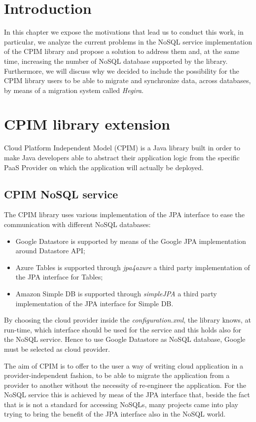 \section{Introduction}
In this chapter we expose the motivations that lead us to conduct this work, in particular, we analyze the current problems in the NoSQL service implementation of the CPIM library and propose a solution to address them and, at the same time, increasing the number of NoSQL database supported by the library.
\noindent Furthermore, we will discuss why we decided to include the possibility for the CPIM library users to be able to migrate and synchronize data, across databases, by means of a migration system called \textit{Hegira}.

\section{CPIM library extension}
Cloud Platform Independent Model (CPIM) \cite{thesis:cpim} is a Java library built in order to make Java developers able to abstract their application logic from the specific PaaS Provider on which the application will actually be deployed.



\subsection{CPIM NoSQL service}
The CPIM library uses various implementation of the JPA interface to ease the communication with different NoSQL databases:
\begin{itemize}
\item Google Datastore is supported by means of the Google JPA implementation around Datastore API;
\item Azure Tables is supported through \textit{jpa4azure} a third party implementation of the JPA interface for Tables;
\item Amazon Simple DB is supported through \textit{simpleJPA} a third party implementation of the JPA interface for Simple DB.
\end{itemize}
\noindent By choosing the cloud provider inside the \textit{configuration.xml}, the library knows, at run-time, which interface should be used for the service and this holds also for the NoSQL service. Hence to use Google Datastore as NoSQL database, Google must be selected as cloud provider.

\noindent The aim of CPIM is to offer to the user a way of writing cloud application in a provider-independent fashion, to be able to migrate the application from a provider to another without the necessity of re-engineer the application. For the NoSQL service this is achieved by meas of the JPA interface that, beside the fact that is is not a standard for accessing NoSQLs, many projects came into play trying to bring the benefit of the JPA interface also in the NoSQL world.

